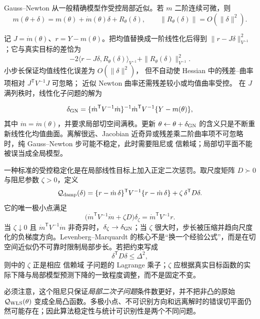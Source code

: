 \begin{definition}
Gauss--Newton 从一般精确模型作受控局部近似。若 $m$ 二阶连续可微，则
\[
 m(\theta+\delta)
 =m(\theta)+\dot m(\theta)\delta+R_\theta(\delta),
 \qquad
 \|R_\theta(\delta)\|=O(\|\delta\|^2).
\]

记 $J=\dot m(\theta)$、$r=Y-m(\theta)$。把均值替换成一阶线性化后得到
$\|r-J\delta\|_{V^{-1}}^2$；它与真实目标的差恰为
\[
 -2\langle r-J\delta,R_\theta(\delta)\rangle_{V^{-1}}
 +\|R_\theta(\delta)\|_{V^{-1}}^2.
\]
小步长保证均值线性化误差为 $O(\|\delta\|^2)$，
但不自动使 Hessian 中的残差--曲率项相对 $J^{\mathsf T}V^{-1}J$ 可忽略；
近似 Newton 曲率还需残差较小或均值曲率受控。
在 $J$ 满列秩时，线性化子问题的解为

\begin{equation*}\delta_{\rm GN}
 =\{\dot m^{\mathsf T}V^{-1}\dot m\}^{-1}
 \dot m^{\mathsf T}V^{-1}\{Y-m(\theta)\},
\end{equation*}
其中 $\dot m=\dot m(\theta)$，并要求局部切空间满秩。更新 $\theta\leftarrow\theta+\delta_{\rm GN}$ 的含义只是不断重新线性化均值曲面。离解很远、Jacobian 近奇异或残差乘二阶曲率项不可忽略时，纯 Gauss--Newton 步可能不稳定，此时需要阻尼或 信赖域；局部切平面不能被误当成全局模型。
\end{definition}

\begin{proposition}
一种标准的受控稳定化是在局部线性目标上加入正定二次惩罚。取尺度矩阵 $D\succ0$ 与阻尼参数 $\zeta>0$，定义
\[
 \mathcal Q_{\rm damp}(\delta)
 =\{r-\dot m\,\delta\}^{\mathsf T}V^{-1}\{r-\dot m\,\delta\}
 +\zeta\,\delta^{\mathsf T}D\delta.
\]
它的唯一极小点满足
\begin{equation}\label{eq:math-stat-levenberg-marquardt-step}
 \bigl(\dot m^{\mathsf T}V^{-1}\dot m+\zeta D\bigr)\delta_\zeta
 =\dot m^{\mathsf T}V^{-1}r.
\end{equation}
当 $\zeta\downarrow0$ 且 $\dot m^{\mathsf T}V^{-1}\dot m$ 非奇异时，$\delta_\zeta\to\delta_{\rm GN}$；当 $\zeta$ 很大时，步长被压缩并趋向尺度化的负梯度方向。Levenberg--Marquardt 的核心不是“换一个经验公式”，而是在切空间近似仍不可靠时限制局部步长。若把约束写成
\[
 \delta^{\mathsf T}D\delta\le\Delta^2,
\]
则中的 $\zeta$ 正是相应 信赖域 子问题的 Lagrange 乘子；$\zeta$ 应根据真实目标函数的实际下降与局部模型预测下降的一致程度调整，而不是固定不变。

必须注意，这个阻尼只保证\emph{局部二次子问题}条件数更好，并不把非凸的原始 $\mathcal Q_{\rm WLS}(\theta)$ 变成全局凸函数。多极小点、不可识别方向和远离解时的错误切平面仍然可能存在；因此算法稳定性与统计可识别性是两个不同问题。
\end{proposition}

